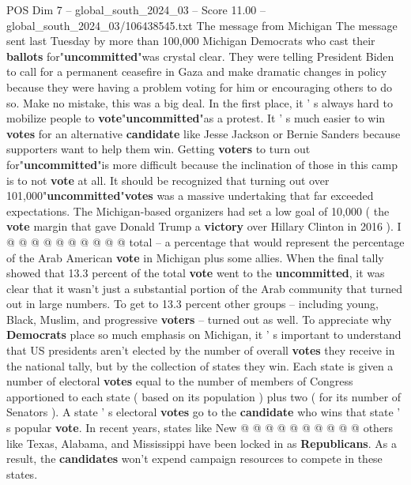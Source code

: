 \begin{textsample}{POS Dim 7 – global\_south\_2024\_03 – Score 11.00 – global\_south\_2024\_03/106438545.txt}  \label{ex:f7_pos_158}
The message from Michigan The message sent last Tuesday by more than 100,000 Michigan Democrats who cast their \textbf{ballots} for"\textbf{uncommitted}"was crystal clear.
They were telling President Biden to call for a permanent ceasefire in Gaza and make dramatic changes in policy because they were having a problem voting for him or encouraging others to do so.
Make no mistake, this was a big deal.
In the first place, it ' s always hard to mobilize people to \textbf{vote}"\textbf{uncommitted}"as a protest.
It ' s much easier to win \textbf{votes} for an alternative \textbf{candidate} like Jesse Jackson or Bernie Sanders because supporters want to help them win.
Getting \textbf{voters} to turn out for"\textbf{uncommitted}"is more difficult because the inclination of those in this camp is to not \textbf{vote} at all.
It should be recognized that turning out over 101,000"\textbf{uncommitted}"\textbf{votes} was a massive undertaking that far exceeded expectations.
The Michigan-based organizers had set a low goal of 10,000 ( the \textbf{vote} margin that gave Donald Trump a \textbf{victory} over Hillary Clinton in 2016 ).
I @ @ @ @ @ @ @ @ @ @ total -- a percentage that would represent the percentage of the Arab American \textbf{vote} in Michigan plus some allies.
When the final tally showed that 13.3 percent of the total \textbf{vote} went to the \textbf{uncommitted}, it was clear that it wasn't just a substantial portion of the Arab community that turned out in large numbers.
To get to 13.3 percent other groups -- including young, Black, Muslim, and progressive \textbf{voters} -- turned out as well.
To appreciate why \textbf{Democrats} place so much emphasis on Michigan, it ' s important to understand that US presidents aren't elected by the number of overall \textbf{votes} they receive in the national tally, but by the collection of states they win.
Each state is given a number of electoral \textbf{votes} equal to the number of members of Congress apportioned to each state ( based on its population ) plus two ( for its number of Senators ).
A state ' s electoral \textbf{votes} go to the \textbf{candidate} who wins that state ' s popular \textbf{vote}.
In recent years, states like New @ @ @ @ @ @ @ @ @ @ others like Texas, Alabama, and Mississippi have been locked in as \textbf{Republicans}.
As a result, the \textbf{candidates} won't expend campaign resources to compete in these states.

\end{textsample}
